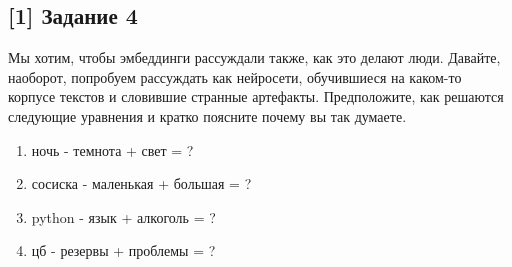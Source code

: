 \documentclass[12pt, a4paper, oneside]{article}
\begin{document}
\vspace{-0.5cm}
\subsection*{[1] Задание 4}
\vspace{-0.5cm}
Мы хотим, чтобы эмбеддинги рассуждали также, как это делают люди. Давайте, наоборот, попробуем рассуждать как нейросети, обучившиеся на каком-то корпусе текстов и словившие странные артефакты. Предположите, как решаются следующие уравнения и кратко поясните почему вы так думаете.

\begin{enumerate} 
    \item  ночь - темнота + свет = ? 
    \item  сосиска - маленькая + большая = ? 
    \item  python - язык + алкоголь = ? 
    \item  цб - резервы + проблемы = ?
\end{enumerate} 
\end{document}
